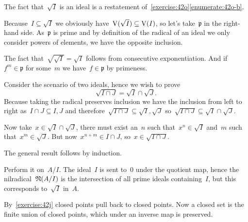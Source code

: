 \begin{exercise} %
  \label{exercise:44d}
  The fact that~$\sqrt{I}$ is an ideal is a restatement of~\autoref{exercise:42o}\ref{enumerate:42o-b}.
  
  Because~$I\subseteq\sqrt{I}$ we obviously have~$\operatorname{V}(\sqrt{I})\subseteq\operatorname{V}(I)$, so let's take~$\mathfrak{p}$ in the right-hand side. As~$\mathfrak{p}$ is prime and by definition of the radical of an ideal we only consider powers of elements, we have the opposite inclusion.

  The fact that~$\sqrt{\sqrt{I}}=\sqrt{I}$ follows from consecutive exponentiation. And if~$f^m\in\mathfrak{p}$ for some~$m$ we have~$f\in\mathfrak{p}$ by primeness.
\end{exercise}

\begin{exercise}
  Consider the scenario of two ideals, hence we wish to prove
  \begin{equation}
    \sqrt{I\cap J}=\sqrt{I}\cap\sqrt{J}.
  \end{equation}
  Because taking the radical preserves inclusion we have the inclusion from left to right as~$I\cap J\subseteq I,J$ and therefore~$\sqrt{I\cap J}\subseteq\sqrt{I},\sqrt{J}$ so~$\sqrt{I\cap J}\subseteq\sqrt{I}\cap\sqrt{J}$.
  
  Now take~$x\in\sqrt{I}\cap\sqrt{J}$, there must exist an~$n$ such that~$x^n\in\sqrt{I}$ and~$m$ such that~$x^m\in\sqrt{J}$. But now~$x^{n+m}\in I\cap J$, so~$x\in\sqrt{I\cap J}$.

  The general result follows by induction.
\end{exercise}

\begin{exercise}
  \label{exercise:44f}
  Perform it on~$A/I$. The ideal~$I$ is sent to~$0$ under the quotient map, hence the nilradical~$\mathfrak{N}(A/I)$ is the intersection of all prime ideals containing~$I$, but this corresponds to~$\sqrt{I}$ in~$A$.
\end{exercise}

\begin{exercise}
  By~\autoref{exercise:42j} closed points pull back to closed points. Now a closed set is the finite union of closed points, which under an inverse map is preserved.
\end{exercise}

